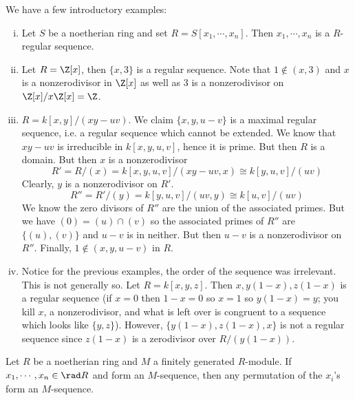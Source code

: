 \begin{ex}
We have a few introductory examples:
\begin{enumerate}[(i)]
\item Let $S$ be a noetherian ring and set $R=S[x_1,\cdots,x_n]$. Then $x_1,\cdots,x_n$ is a $R$-regular sequence.
\item Let $R=\Z[x]$, then $\{x,3\}$ is a regular sequence. Note that $1 \notin (x,3)$ and $x$ is a nonzerodivisor in $\Z[x]$ as well as $3$ is a nonzerodivisor on $\Z[x]/x\Z[x]=\Z$.
\item $R=k[x,y]/(xy-uv)$. We claim $\{x,y,u-v\}$ is a maximal regular sequence, i.e. a regular sequence which cannot be extended. We know that $xy-uv$ is irreducible in $k[x,y,u,v]$, hence it is prime. But then $R$ is a domain. But then $x$ is a nonzerodivisor 
\[
R'=R/(x)=k[x,y,u,v]/(xy-uv,x) \cong k[y,u,v]/(uv)
\]
Clearly, $y$ is a nonzerodivisor on $R'$.
\[
R''=R'/(y)=k[y,u,v]/(uv,y) \cong k[u,v]/(uv)
\]
We know the zero divisors of $R''$ are the union of the associated primes. But we have $(0)=(u) \cap (v)$ so the associated primes of $R''$ are $\{(u),(v)\}$ and $u-v$ is in neither. But then $u-v$ is a nonzerodivisor on $R''$. Finally, $1 \notin (x,y,u-v)$ in $R$. 

\item Notice for the previous examples, the order of the sequence was irrelevant. This is not generally so. Let $R=k[x,y,z]$. Then $x,y(1-x),z(1-x)$ is a regular sequence (if $x=0$ then $1-x=0$ so $x=1$ so $y(1-x)=y$; you kill $x$, a nonzerodivisor, and what is left over is congruent to a sequence which looks like $\{y,z\}$). However, $\{y(1-x),z(1-x),x\}$ is not a regular sequence since $z(1-x)$ is a zerodivisor over $R/(y(1-x))$. 
\end{enumerate}
\end{ex}

\begin{prop}
Let $R$ be a noetherian ring and $M$ a finitely generated $R$-module. If $x_1,\cdots,x_n \in \rad R$ and form an $M$-sequence, then any permutation of the $x_i$'s form an $M$-sequence. 
\end{prop}

